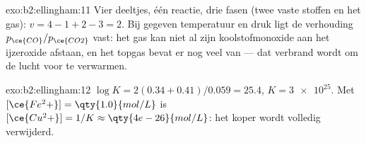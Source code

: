 \begin{solution}{exo:b2:ellingham:11}
Vier deeltjes, één reactie, drie fasen (twee vaste stoffen en het gas): $v = 4 - 1 +
2 - 3 = 2$. Bij gegeven temperatuur en druk ligt de verhouding $p_{\ce{CO}}/p_{\ce{CO2}}$
vast: het gas kan niet al zijn koolstofmonoxide aan het ijzeroxide afstaan,
en het topgas bevat er nog veel van --- dat verbrand wordt om de
lucht voor te verwarmen.
\end{solution}

\begin{solution}{exo:b2:ellingham:12}
$\log K = 2(0.34 + 0.41)/0.059 = 25.4$, $K = \num{3e25}$. Met
$[\ce{Fe^2+}] = \qty{1.0}{mol/L}$ is $[\ce{Cu^2+}] = 1/K \approx
\qty{4e-26}{mol/L}$: het koper wordt volledig verwijderd.
\end{solution}

